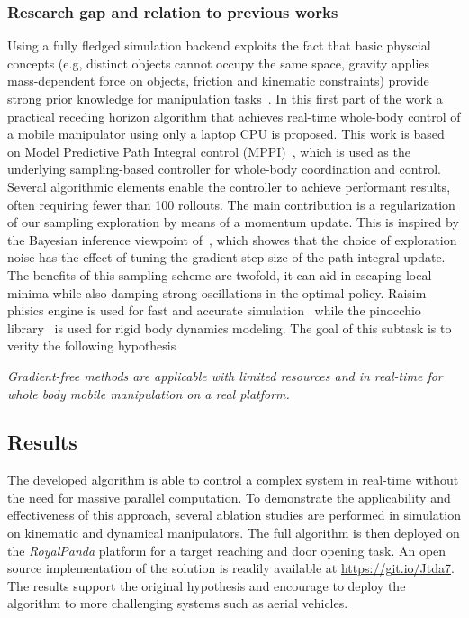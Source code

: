 \subsubsection{Research gap and relation to previous works}
Using a fully fledged simulation backend exploits the fact that basic physcial concepts (e.g, distinct objects cannot occupy the same space, gravity applies mass-dependent force on objects, friction and kinematic constraints) provide strong prior knowledge for manipulation tasks~\cite{kroemer2019review}. In this first part of the work a practical receding horizon algorithm that achieves real-time whole-body control of a mobile manipulator using only a laptop CPU is proposed. This work is based on Model Predictive Path Integral control (MPPI)~\cite{williams_information_2017}, which is used as the underlying sampling-based controller for whole-body coordination and control. Several algorithmic elements enable the controller to achieve performant results, often requiring fewer than 100 rollouts. The main contribution is a regularization of our sampling exploration by means of a momentum update. This is inspired by the Bayesian inference viewpoint of~\cite{lambert_stein_2020}, which showes that the choice of exploration noise has the effect of tuning the gradient step size of the path integral update. The benefits of this sampling scheme are twofold, it can aid in escaping local minima while also damping strong oscillations in the optimal policy. Raisim phisics engine is used for fast and accurate simulation~\cite{raisim} while the pinocchio library~\cite{pinocchioweb} is used for rigid body dynamics modeling. The goal of this subtask is to verity the following hypothesis
\begin{displayquote}
\textit{Gradient-free methods are applicable with limited resources and in real-time for whole body mobile manipulation on a real platform.}
\end{displayquote}

\subsection{Results}
The developed algorithm is able to control a complex system in real-time without the need for massive parallel computation. To demonstrate the applicability and effectiveness of this approach, several ablation studies are performed in simulation on kinematic and dynamical manipulators. The full algorithm is then deployed on the \textit{RoyalPanda} platform for a target reaching and door opening task. An open source implementation of the solution is readily available at \url{https://git.io/Jtda7}. The results support the original hypothesis and encourage to deploy the algorithm to more challenging systems such as aerial vehicles.

